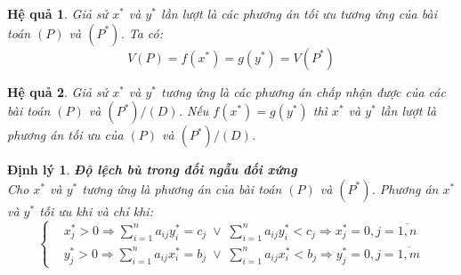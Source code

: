 \documentclass{article}
\newtheorem{dl}{Định lý}
\newtheorem{hq}{Hệ quả}
\begin{document}
                \begin{hq}
                    Giả sử $x^*$ và $y^*$ lần lượt là các phương án tối ưu tương ứng của bài toán $(P)$ và $(P^*)$. Ta có:
                    $$V(P)=f(x^*)=g(y^*)=V(P^*)$$
                \end{hq}
                \begin{hq}
                    Giả sử $x^*$ và $y^*$ tương ứng là các phương án chấp nhận được của các bài toán $(P)$ và $(P^*)/(D)$. Nếu $f(x^*)=g(y^*)$ thì $x^*$ và $y^*$ lần lượt là phương án tối ưu của $(P)$ và $(P^*)/(D)$.
                \end{hq}
                \begin{dl}{\textbf{Độ lệch bù trong đối ngẫu đối xứng}}\\
                    Cho $x^*$ và $y^*$ tương ứng là phương án của bài toán $(P)$ và $(P^*)$. Phương án $x^*$ và $y^*$ tối ưu khi và chỉ khi:
                    \[\left\{\begin{aligned}
                        & x_j^* > 0 \Longrightarrow \displaystyle\sum\limits_{i=1}^na_{ij}y_i^*=c_j \;\vee\;\displaystyle\sum\limits_{i=1}^na_{ij}y_i^* < c_j\Longrightarrow x_j^* =0,j=\overline{1,n}\\
                        & y_j^* > 0 \Longrightarrow \displaystyle\sum\limits_{i=1}^na_{ij}x_i^*=b_j \;\vee\;\displaystyle\sum\limits_{i=1}^na_{ij}x_i^* < b_j\Longrightarrow y_j^* =0,j=\overline{1,m}
                    \end{aligned}\right.\]
                \end{dl}
\end{document}
